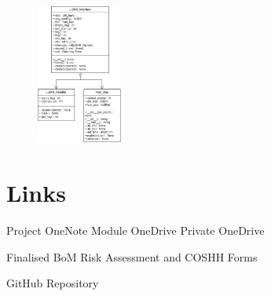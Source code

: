 \documentclass [12pt]{article}
\begin{document}
\begin{figure}[h]
    \centering
    \includegraphics[width=0.25\textwidth]{lidar_interface.jpg}
    \caption{}
    \label{fig:lidar_interface}
\end{figure}

\section{Links}

Project OneNote \cite{onenote}
Module OneDrive \cite{unidrive}
Private OneDrive \cite{privdrive}

Finalised BoM \cite{bom}
Risk Assessment and COSHH Forms \cite{RA}

GitHub Repository \cite{github}
\end{document}
